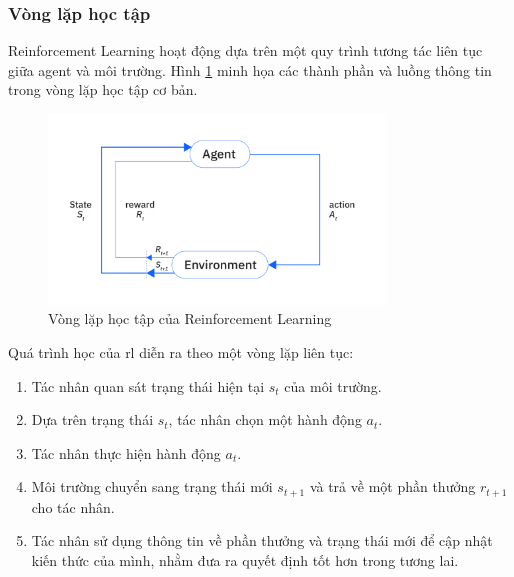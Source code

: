 \subsubsection{Vòng lặp học tập}
Reinforcement Learning hoạt động dựa trên một quy trình tương tác liên tục giữa agent và môi trường. Hình \ref{fig:RL-components} minh họa các thành phần và luồng thông tin trong vòng lặp học tập cơ bản.

\begin{figure}[!htp]
    \centering
    \includegraphics[width=0.8\textwidth]{img/RL_components.png}
    \caption{Vòng lặp học tập của Reinforcement Learning \cite{IBM2024}}
    \label{fig:RL-components}
\end{figure}
Quá trình học của \ac{rl} diễn ra theo một vòng lặp liên tục:

\begin{enumerate}
    \item Tác nhân quan sát trạng thái hiện tại $s_{t}$ của môi trường.

    \item Dựa trên trạng thái $s_{t}$, tác nhân chọn một hành động $a_{t}$.

    \item Tác nhân thực hiện hành động $a_{t}$.

    \item Môi trường chuyển sang trạng thái mới $s_{t+1}$ và trả về một phần thưởng        $r_{t+1}$ cho tác nhân.

    \item Tác nhân sử dụng thông tin về phần thưởng và trạng thái mới để cập nhật kiến thức của mình, nhằm đưa ra quyết định tốt hơn trong tương lai.
\end{enumerate}


